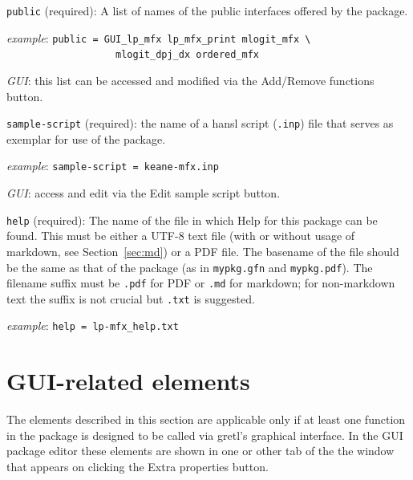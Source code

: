 \documentclass[oneside]{book}
\newcommand{\ttusage}[1]{\textit{example}: \quad \texttt{#1}}
\newcommand{\vbusage}[0]{\textit{example}: \quad}
\begin{document}
\begin{description}

\item \texttt{public} (required): A list of names of the public
  interfaces offered by the package.

  \vbusage{} \verb|public = GUI_lp_mfx lp_mfx_print mlogit_mfx \| \\
           \verb|                   mlogit_dpj_dx ordered_mfx |

  \textit{GUI}: this list can be accessed and modified via the
  \textsf{Add/Remove functions} button.

\item \texttt{sample-script} (required): the name of a hansl
   script (\texttt{.inp}) file that serves as exemplar for use
   of the package.

   \ttusage{sample-script = keane-mfx.inp}

   \textit{GUI}: access and edit via the \textsf{Edit sample script}
   button.

 \item \texttt{help} (required): The name of the file in which Help
   for this package can be found. This must be either a UTF-8 text
   file (with or without usage of markdown, see Section~\ref{sec:md})
   or a PDF file. The basename of the file should be the same as that
   of the package (as in \texttt{mypkg.gfn} and \texttt{mypkg.pdf}).
   The filename suffix must be \texttt{.pdf} for PDF or \texttt{.md}
   for markdown; for non-markdown text the suffix is not crucial but
   \texttt{.txt} is suggested.

  \vbusage{} \verb|help = lp-mfx_help.txt|

\end{description}

\section{GUI-related elements}
\label{sec:spec-gui}

The elements described in this section are applicable only if at least
one function in the package is designed to be called via gretl's
graphical interface. In the GUI package editor these elements are
shown in one or other tab of the the window that appears on clicking
the \textsf{Extra properties} button.
\end{document}
